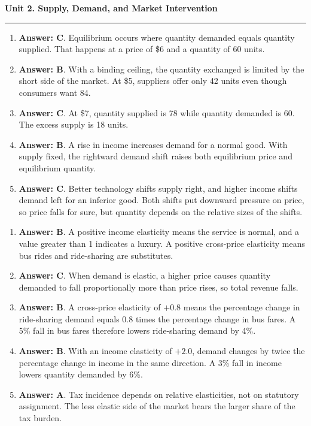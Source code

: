 \documentclass[10pt]{article}
\newcommand{\unitheader}[2]{%
  \vspace{0.35em}
  {\Large\bfseries Unit #1. #2\par}
  \vspace{0.2em}
  \hrule
  \vspace{0.55em}
}
\begin{document}
\unitheader{2}{Supply, Demand, and Market Intervention}
\begin{enumerate}[resume*=aps, leftmargin=*, itemsep=0.6em, topsep=0.2em, parsep=0pt]
\item \textbf{Answer: C}. Equilibrium occurs where quantity demanded equals quantity supplied. That happens at a price of \$6 and a quantity of 60 units.
\item \textbf{Answer: B}. With a binding ceiling, the quantity exchanged is limited by the short side of the market. At \$5, suppliers offer only 42 units even though consumers want 84.
\item \textbf{Answer: C}. At \$7, quantity supplied is 78 while quantity demanded is 60. The excess supply is 18 units.
\item \textbf{Answer: B}. A rise in income increases demand for a normal good. With supply fixed, the rightward demand shift raises both equilibrium price and equilibrium quantity.
\item \textbf{Answer: C}. Better technology shifts supply right, and higher income shifts demand left for an inferior good. Both shifts put downward pressure on price, so price falls for sure, but quantity depends on the relative sizes of the shifts.
\end{enumerate}
\begin{enumerate}[resume*=aps, leftmargin=*, itemsep=0.6em, topsep=0.2em, parsep=0pt]
\item \textbf{Answer: B}. A positive income elasticity means the service is normal, and a value greater than 1 indicates a luxury. A positive cross-price elasticity means bus rides and ride-sharing are substitutes.
\item \textbf{Answer: C}. When demand is elastic, a higher price causes quantity demanded to fall proportionally more than price rises, so total revenue falls.
\item \textbf{Answer: B}. A cross-price elasticity of $+0.8$ means the percentage change in ride-sharing demand equals $0.8$ times the percentage change in bus fares. A 5\% fall in bus fares therefore lowers ride-sharing demand by 4\%.
\item \textbf{Answer: B}. With an income elasticity of $+2.0$, demand changes by twice the percentage change in income in the same direction. A 3\% fall in income lowers quantity demanded by 6\%.
\item \textbf{Answer: A}. Tax incidence depends on relative elasticities, not on statutory assignment. The less elastic side of the market bears the larger share of the tax burden.
\end{enumerate}
\end{document}

